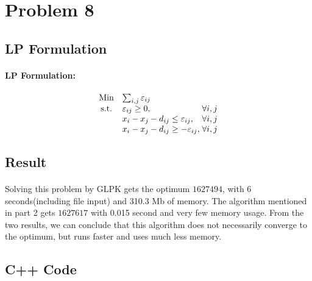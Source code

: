 \documentclass[]{article}
\begin{document}
    \section{Problem 8}
        \subsection{LP Formulation}
        \paragraph{LP Formulation:} 
        \begin{equation*}
\begin{array}{cl@{}ll}
\text{Min}  & \sum_{i,j}\varepsilon_{ij} &\\
\text{s.t.} & \varepsilon_{ij} \geq 0,\;  & \forall i,j  \\
            & x_i - x_j - d_{ij} \leq \varepsilon_{ij},\;  & \forall i,j   \\
            & x_i - x_j - d_{ij} \geq -\varepsilon_{ij},\; & \forall i,j  \\
            
\end{array}
        \end{equation*}
        \subsection{Result}
            \paragraph{}Solving this problem by GLPK gets the optimum $1627494$, with 6 seconds(including file input) and 310.3 Mb of memory. The algorithm mentioned in part 2 gets $1627617$ with 0.015 second and very few memory usage. From the two results, we can conclude that this algorithm does not necessarily converge to the optimum, but runs faster and uses much less memory.
        \subsection{C++ Code}
            
    
    
\end{document}
